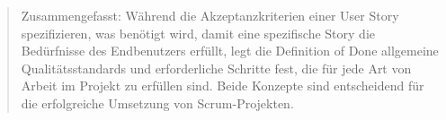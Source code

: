 \documentclass[main.tex]{subfiles}
\begin{document}
\begin{quote}
Zusammengefasst: Während die Akzeptanzkriterien einer User Story spezifizieren, was benötigt wird, damit eine spezifische Story die Bedürfnisse des Endbenutzers erfüllt, legt die Definition of Done allgemeine Qualitätsstandards und erforderliche Schritte fest, die für jede Art von Arbeit im Projekt zu erfüllen sind. Beide Konzepte sind entscheidend für die erfolgreiche Umsetzung von Scrum-Projekten.
\end{quote}
\end{document}

